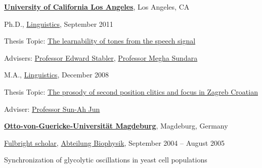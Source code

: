 \documentclass[10pt]{article}
\newcommand{\halfblankline}{\quad\vspace{-0.5\baselineskip}\pagebreak[3]}
\begin{document}
\href{http://www.ucla.edu}{\textbf{University of California Los Angeles}},
Los Angeles, CA
\begin{outerlist}

\item[] Ph.D.,
        \href{http://www.linguistics.ucla.edu}
             {Linguistics},
             September 2011
        \begin{innerlist}
        \item Thesis Topic: \href{http://www.krisyu.org/pages/pdfs/yu2011_diss.pdf}{The learnability of tones from the speech signal}
        \item Advisers:
              \href{http://www.linguistics.ucla.edu/people/stabler/}
                   {Professor Edward Stabler}, 
              \href{http://www.linguistics.ucla.edu/people/Sundara/}
                   {Professor Megha Sundara}
        \end{innerlist}

\item[] M.A.,
        \href{http://www.linguistics.ucla.edu}
             {Linguistics},
             December 2008
        \begin{innerlist}
        \item Thesis Topic: \href{http://www.linguistics.ucla.edu/general/matheses/Yu_UCLA_MA_2008.pdf}{The prosody of second position clitics and focus in Zagreb Croatian}
        \item Adviser:
              \href{http://www.linguistics.ucla.edu/people/jun/sun-ah.htm}
                   {Professor Sun-Ah Jun}
        \end{innerlist}

\end{outerlist}


\halfblankline


\href{http://www.uni-magdeburg.de/en/home-p-1.html}{\textbf{Otto-von-Guericke-Universit\"{a}t
  Magdeburg}},
Magdeburg, Germany
\begin{outerlist}

\item[] \href{http://www.fulbright.de/togermany/}{Fulbright scholar},
        \href{http://www.biophysik.ovgu.de/}
             {Abteilung Biophysik}, September 2004 -- August 2005
        \begin{innerlist}
        \item Synchronization of glycolytic oscillations in yeast cell populations
        \end{innerlist}

\end{outerlist}
\end{document}
